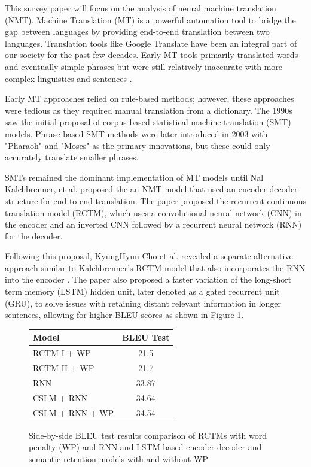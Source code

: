 \documentclass[11pt,a4paper]{article}
\begin{document}
This survey paper will focus on the analysis of neural machine translation (NMT). Machine Translation (MT) is a powerful automation tool to bridge the gap between languages by providing end-to-end translation between two languages. Translation tools like Google Translate have been an integral part of our society for the past few decades. Early MT tools primarily translated words and eventually simple phrases but were still relatively inaccurate with more complex linguistics and sentences \cite{WANG2022143}.

Early MT approaches relied on rule-based methods; however, these approaches were tedious as they required manual translation from a dictionary. The 1990s saw the initial proposal of corpus-based statistical machine translation (SMT) models. Phrase-based SMT methods were later introduced in 2003 with "Pharaoh" and "Moses" as the primary innovations, but these could only accurately translate smaller phrases. \cite{WANG2022143}

SMTs remained the dominant implementation of MT models until Nal Kalchbrenner, et al. \cite{kalchbrenner-blunsom-2013-recurrent} proposed the an NMT model that used an encoder-decoder structure for end-to-end translation. The paper proposed the recurrent continuous translation model (RCTM), which uses a convolutional neural network (CNN) in the encoder and an inverted CNN followed by a recurrent neural network (RNN) for the decoder.

Following this proposal, KyungHyun Cho et al. revealed a separate alternative approach similar to Kalchbrenner's RCTM model that also incorporates the RNN into the encoder \cite{cho2014learning}. The paper also proposed a faster variation of the long-short term memory (LSTM) hidden unit, later denoted as a gated recurrent unit (GRU), to solve issues with retaining distant relevant information in longer sentences, allowing for higher BLEU scores as shown in Figure 1.

\begin{figure}[h]
    \centering
    \begin{tabular}{| l || c |}
    \hline
    Model & BLEU Test\\
    \hline
    \hline
    RCTM I + WP & 21.5\\
    RCTM II + WP & 21.7\\
    \hline
    RNN & 33.87\\
    CSLM + RNN & 34.64\\
    CSLM + RNN + WP & 34.54\\
    \hline
    \end{tabular}
    \caption{Side-by-side BLEU test results comparison of RCTMs \cite{kalchbrenner-blunsom-2013-recurrent} with word penalty (WP) and RNN and LSTM based encoder-decoder and semantic retention models with and without WP \cite{cho2014learning}}
\end{figure}
\end{document}
